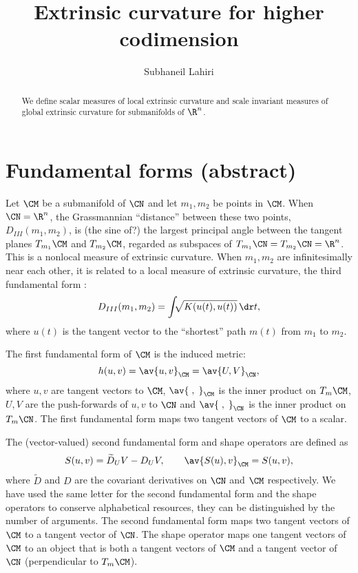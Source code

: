 \documentclass[12pt]{article}
\begin{document}
\title{Extrinsic curvature for higher codimension}%
\author{Subhaneil Lahiri}%
\maketitle
\begin{abstract}
  We define scalar measures of local extrinsic curvature and scale invariant measures of global extrinsic curvature for submanifolds of $\R^n$.
\end{abstract}

\section{Fundamental forms (abstract)}\label{sec:fundforms}

Let $\CM$ be a submanifold of $\CN$ and let $m_1,m_2$ be points in $\CM$.
When $\CN=\R^n$, the Grassmannian ``distance'' between these two points, $D_{III}(m_1,m_2)$, is (the sine of?) the largest principal angle between the tangent planes $T_{m_1}\CM$ and $T_{m_2}\CM$, regarded as subspaces of $T_{m_1}\CN = T_{m_2}\CN = \R^n$.
This is a nonlocal measure of extrinsic curvature.
When $m_1,m_2$ are infinitesimally near each other, it is related to a local measure of extrinsic curvature, the third fundamental form \cite{clarkson2008tighter}:
%
\begin{equation}\label{eq:grassmannian_dist}
  D_{III}(m_1,m_2) = \int \!\!\! \sqrt{K(u(t),u(t))} \, \dr t,
\end{equation}
%
where $u(t)$ is the tangent vector to the ``shortest'' path $m(t)$ from $m_1$ to $m_2$.

The first fundamental form of $\CM$ is the induced metric:
%
\begin{equation}\label{eq:first_fund}
  h(u,v) = \av{u,v}_\CM = \av{U,V}_{\CN},
\end{equation}
%
where $u,v$ are tangent vectors to $\CM$, $\av{\;,\;}_\CM$ is the inner product on $T_{m}\CM$, $U,V$ are the push-forwards of $u,v$ to $\CN$ and $\av{\;,\;}_{\CN}$ is the inner product on $T_{m}\CN$.
The first fundamental form maps two tangent vectors of $\CM$ to a scalar.

The (vector-valued) second fundamental form and shape operators are defined as \cite[\S V.A]{gallot1990riemannian}
%
\begin{equation}\label{eq:second fund}
  S(u,v) = \widetilde{D}_U V - D_U V,
  \qquad \av{S(u),v}_\CM = S(u,v),
\end{equation}
%
where $\widetilde{D}$ and $D$ are the covariant derivatives on $\CN$ and $\CM$ respectively.
We have used the same letter for the second fundamental form and the shape operators to conserve alphabetical resources, they can be distinguished by the number of arguments.
The second fundamental form maps two tangent vectors of $\CM$ to a tangent vector of $\CN$.
The shape operator maps one tangent vectors of $\CM$ to an object that is both a tangent vectors of $\CM$ and a tangent vector of $\CN$ (perpendicular to $T_m\CM$).
\end{document}
